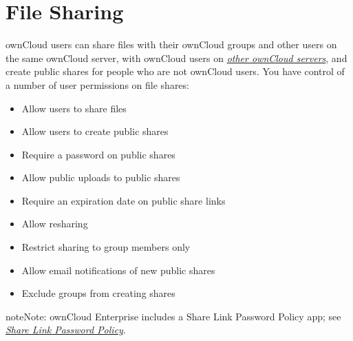 \documentclass[letterpaper,10pt,english]{sphinxmanual}
\begin{document}
\section{File Sharing}
\label{configuration_files/file_sharing_configuration:file-sharing}\label{configuration_files/file_sharing_configuration::doc}
ownCloud users can share files with their ownCloud groups and other users on
the same ownCloud server, with ownCloud users on {\hyperref[configuration_files/federated_cloud_sharing_configuration::doc]{\emph{\emph{other ownCloud servers}}}}, and create public shares for people who are not
ownCloud users. You have control of a number of user permissions on file shares:
\begin{itemize}
\item {} 
Allow users to share files

\item {} 
Allow users to create public shares

\item {} 
Require a password on public shares

\item {} 
Allow public uploads to public shares

\item {} 
Require an expiration date on public share links

\item {} 
Allow resharing

\item {} 
Restrict sharing to group members only

\item {} 
Allow email notifications of new public shares

\item {} 
Exclude groups from creating shares

\end{itemize}

\begin{notice}{note}{Note:}
ownCloud Enterprise includes a Share Link Password Policy app; see
{\hyperref[configuration_files/file_sharing_configuration:password\string-policy\string-label]{\emph{Share Link Password Policy}}}.
\end{notice}
\end{document}
